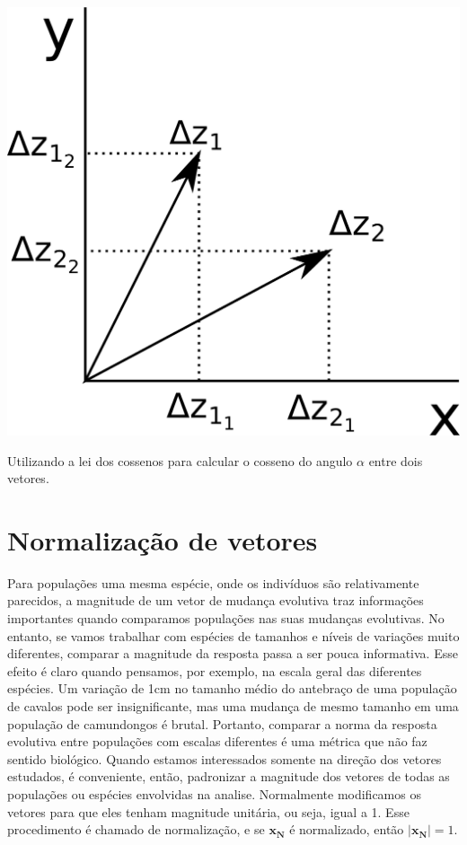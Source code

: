 \documentclass[portuges,]{tufte-handout}
\begin{document}
\begin{marginfigure}
\includegraphics{./figuras/leidoscossenos.png}
\caption{Utilizando a lei dos cossenos para calcular o cosseno
do angulo \(\alpha\) entre dois vetores.}
\label{leidoscossenos}
\end{marginfigure}

\section{Normalização de vetores}\label{normalizauxe7uxe3o-de-vetores}

Para populações uma mesma espécie, onde os indivíduos são relativamente
parecidos, a magnitude de um vetor de mudança evolutiva traz informações
importantes quando comparamos populações nas suas mudanças evolutivas.
No entanto, se vamos trabalhar com espécies de tamanhos e níveis de
variações muito diferentes, comparar a magnitude da resposta passa a ser
pouca informativa. Esse efeito é claro quando pensamos, por exemplo, na
escala geral das diferentes espécies. Um variação de 1cm no tamanho
médio do antebraço de uma população de cavalos pode ser insignificante,
mas uma mudança de mesmo tamanho em uma população de camundongos é
brutal. Portanto, comparar a norma da resposta evolutiva entre
populações com escalas diferentes é uma métrica que não faz sentido
biológico. Quando estamos interessados somente na direção dos vetores
estudados, é conveniente, então, padronizar a magnitude dos vetores de
todas as populações ou espécies envolvidas na analise. Normalmente
modificamos os vetores para que eles tenham magnitude unitária, ou seja,
igual a 1. Esse procedimento é chamado de normalização, e se
\(\mathbf{x_N}\) é normalizado, então \(|\mathbf{x_N}| = 1\).
\end{document}

